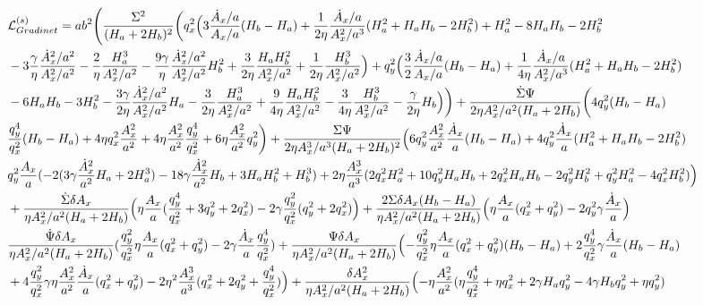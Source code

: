 \documentclass[%
 reprint,
 amsmath,amssymb,
 aps,
]{revtex4-1}
\begin{document}
\begin{widetext}
\begin{equation}
\begin{split}
&\mathcal{L}^{(s)}_{Gradinet}=ab^2\Biggl(\frac{\Sigma^2}{(H_a+2H_b)^2}\biggl(q_x^2\Bigl(3\frac{\dot{A}_x/a}{A_x/a}(H_b-H_a)+\frac{1}{2\eta}\frac{\dot{A}_x/a}{A_x^2/a^3}(H_a^2+H_aH_b-2H_b^2)+H_a^2-8H_aH_b-2H_b^2\\
&-3\frac{\gamma}{\eta}\frac{\dot{A}_x^2/a^2}{A_x^2/a^2}-\frac{2}{\eta}\frac{H_a^3}{A_x^2/a^2}-\frac{9\gamma}{\eta}\frac{\dot{A}_x^2/a^2}{A_x^2/a^2}H_b^2+\frac{3}{2\eta}\frac{H_aH_b^2}{A_x^2/a^2}+\frac{1}{2\eta}\frac{H_b^3}{A_x^2/a^2}\Bigr)+q_y^2\Bigl(\frac{3}{2}\frac{\dot{A}_x/a}{A_x/a}(H_b-H_a)+\frac{1}{4\eta}\frac{\dot{A}_x/a}{A_x^2/a^3}(H_a^2+H_aH_b-2H_b^2)\\
&-6H_aH_b-3H_b^2-\frac{3\gamma}{2\eta}\frac{\dot{A}_x^2/a^2}{A_x^2/a^2}H_a-\frac{3}{2\eta}\frac{H_a^3}{A_x^2/a^2}+\frac{9}{4\eta}\frac{H_aH_b^2}{A_x^2/a^2}-\frac{3}{4\eta}\frac{H_b^3}{A_x^2/a^2}-\frac{\gamma}{2\eta}H_b\Bigr) \biggr)+\frac{\dot{\Sigma}\Psi}{2\eta A_x^2/a^2(H_a+2H_b)}\biggl(4q_y^2(H_b-H_a)\\
&\frac{q_y^4}{q_x^2}(H_b-H_a)+4\eta q_x^2\frac{A_x^2}{a^2}+4\eta \frac{A_x^2}{a^2}\frac{q_y^4}{q_x^2}+6\eta\frac{A_x^2}{a^2}q_y^2\biggr)+\frac{\Sigma\Psi}{2\eta A_x^3/a^3(H_a+2H_b)^2}\Bigl(6q_y^2\frac{A_x^2}{a^2}\frac{\dot{A}_x}{a}(H_b-H_a)+4q_y^2\frac{\dot{A}_x}{a}(H_a^2+H_aH_b-2H_b^2)\\
&q_y^2\frac{A_x}{a}(-2(3\gamma\frac{\dot{A}_x^2}{a^2}H_a+2H_a^3)-18\gamma\frac{\dot{A}_x^2}{a^2}H_b+3H_aH_b^2+H_b^3)+2\eta \frac{A_x^3}{a^3}(2q_x^2H_a^2+10q_y^2H_aH_b+2q_x^2H_aH_b-2q_y^2H_b^2+q_y^2H_a^2-4q_x^2H_b^2 )\Bigr)\\
&+\frac{\dot{\Sigma}\delta A_x}{\eta A_x^2/a^2(H_a+2H_b)}\Bigl(\eta \frac{A_x}{a}(\frac{q_y^4}{q_x^2}+3q_y^2+2q_x^2)-2\gamma \frac{q_y^2}{q_x^2}(q_y^2+2q_x^2) \Bigr)+\frac{2\Sigma \delta A_x(H_b-H_a)}{\eta A_x^2/a^2(H_a+2H_b)}\Bigl(\eta\frac{A_x}{a}(q_x^2+q_y^2)-2q_y^2\gamma\frac{\dot{A}_x}{a}\Bigr)\\
&\frac{\dot{\Psi}\delta A_x}{\eta A_x^2/a^2(H_a+2H_b)}(\frac{q_y^2}{q_x^2}\eta\frac{A_x}{a}(q_x^2+q_y^2)-2\gamma\frac{\dot{A}_x}{a}\frac{q_y^4}{q_x^2})+\frac{\Psi\delta A_x}{\eta A_x^2/a^2(H_a+2H_b)}\Bigl(-\frac{q_y^2}{q_x^2}\eta\frac{A_x}{a}(q_x^2+q_y^2)(H_b-H_a)+2\frac{q_y^4}{q_x^2}\gamma\frac{\dot{A}_x}{a}(H_b-H_a)\\
&+4\frac{q_y^2}{q_x^2}\gamma\eta\frac{A_x^2}{a^2}\frac{\dot{A}_x}{a}(q_x^2+q_y^2)-2\eta^2\frac{A_x^3}{a^3}(q_x^2+2q_y^2+\frac{q_y^4}{q_x^2})\Bigr)+\frac{\delta A_x^2}{\eta A_x^2/a^2(H_a+2H_b)}\Bigl(-\eta\frac{A_x^2}{a^2}(\eta\frac{q_y^4}{q_x^2}+\eta q_x^2+2\gamma H_a q_y^2-4\gamma H_bq_y^2+\eta q_y^2)\\

\end{split}
\end{equation}
\end{widetext}
\end{document}
